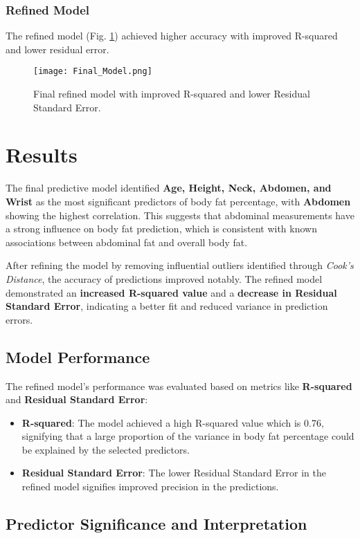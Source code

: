 \documentclass[8pt,twocolumn,twoside]{pnas-new}
\begin{document}
\subsubsection*{Refined Model}
The refined model (Fig. \ref{fig:Final_Model}) achieved higher accuracy with improved R-squared and lower residual error.
\begin{figure}[!htbp]
    \centering
    \texttt{[image: Final\_Model.png]}
    \caption{Final refined model with improved R-squared and lower Residual Standard Error.}
    \label{fig:Final_Model}
\end{figure}
\newpage
\section*{Results}

The final predictive model identified \textbf{Age, Height, Neck, Abdomen, and Wrist} as the most significant predictors of body fat percentage, with \textbf{Abdomen} showing the highest correlation. This suggests that abdominal measurements have a strong influence on body fat prediction, which is consistent with known associations between abdominal fat and overall body fat.

After refining the model by removing influential outliers identified through \textit{Cook's Distance}, the accuracy of predictions improved notably. The refined model demonstrated an \textbf{increased R-squared value} and a \textbf{decrease in Residual Standard Error}, indicating a better fit and reduced variance in prediction errors.

\subsection*{Model Performance}

The refined model's performance was evaluated based on metrics like \textbf{R-squared} and \textbf{Residual Standard Error}:
\begin{itemize}
    \item \textbf{R-squared}: The model achieved a high R-squared value which is 0.76, signifying that a large proportion of the variance in body fat percentage could be explained by the selected predictors.
    \item \textbf{Residual Standard Error}: The lower Residual Standard Error in the refined model signifies improved precision in the predictions.
\end{itemize}

\subsection*{Predictor Significance and Interpretation}
\end{document}
